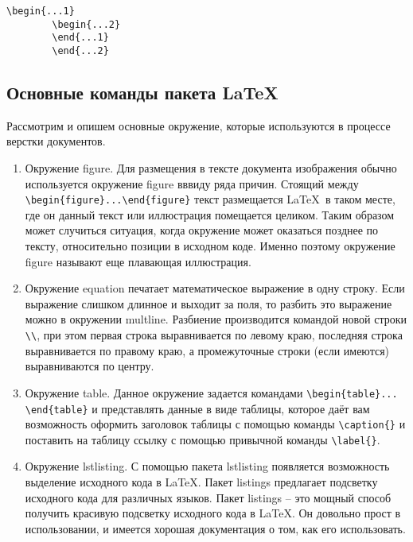     \begin{lstlisting}[language=Tex, caption={Данный порядок команд вызовает ошибку компиляции}, label={ls:00}]
        \begin{...1}
        \begin{...2}
        \end{...1}
        \end{...2}
    \end{lstlisting}

\subsection{Основные команды пакета \LaTeX}
    Рассмотрим и опишем основные окружение, которые используются в процессе верстки документов.
    
    \begin{enumerate}
        \item Окружение figure. Для размещения в тексте документа изображения обычно используется окружение figure вввиду ряда причин. Стоящий между \verb|\begin{figure}...\end{figure}| текст  размещается \LaTeX\verb| |в таком месте, где он данный текст или иллюстрация помещается целиком. Таким образом может случиться ситуация, когда окружение может оказаться позднее по тексту, относительно позиции в исходном коде. Именно поэтому окружение figure называют еще \guillemotleft плавающая иллюстрация\guillemotright.

        \item Окружение equation печатает математическое выражение в одну строку. Если выражение слишком длинное и выходит за поля, то разбить это выражение можно в окружении multline. Разбиение производится командой новой строки \verb|\\|, при этом первая строка выравнивается по левому краю, последняя строка выравнивается по правому краю, а промежуточные строки (если имеются) выравниваются по центру.

        \item Окружение table. Данное окружение задается командами \verb|\begin{table}... \end{table}| и представлять данные в виде таблицы, которое даёт вам возможность оформить заголовок таблицы с помощью команды \verb|\caption{}| и поставить на таблицу ссылку с помощью привычной команды \verb|\label{}|.

        \item Окружение lstlisting. С помощью пакета lstlisting появляется возможность выделение исходного кода в \LaTeX. Пакет listings предлагает подсветку исходного кода для различных языков. Пакет listings -- это мощный способ получить красивую подсветку исходного кода в LaTeX. Он довольно прост в использовании, и имеется хорошая документация о том, как его использовать.
        
    \end{enumerate}
